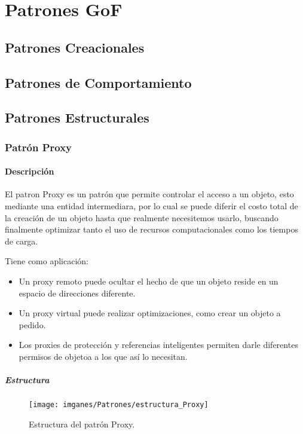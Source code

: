 \chapter{Patrones GoF}
\section{Patrones Creacionales}
\section{Patrones de Comportamiento}

\section{Patrones Estructurales}

\subsection{Patrón Proxy}

\subsubsection{Descripción}
El patron Proxy es un patrón que permite controlar el acceso a un objeto, esto  mediante una entidad intermediara, por lo cual se puede diferir el costo total de la creación de un objeto hasta que realmente necesitemos usarlo, buscando finalmente optimizar tanto el uso de recursos computacionales como los tiempos de carga.

Tiene como aplicación:

\begin{itemize}
	\item Un proxy remoto puede ocultar el hecho de que un objeto reside en un espacio de direcciones diferente.
	\item Un proxy virtual puede realizar optimizaciones, como crear un objeto a pedido.
	\item Los proxies de protección y referencias inteligentes permiten darle diferentes permisos de objetoa a los que así lo necesitan.
\end{itemize}

\paragraph{Estructura}

\begin{figure}[th!]
	\centering
	\texttt{[image: imganes/Patrones/estructura\_Proxy]}
	\caption{Estructura del patrón Proxy.}	
\end{figure}

